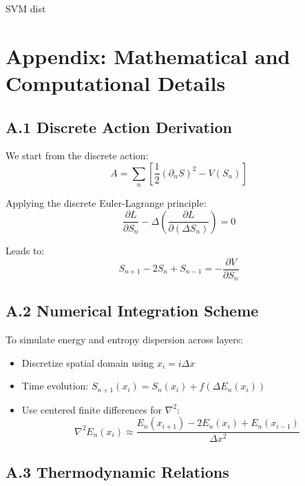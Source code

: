 \documentclass[11pt]{article}
\begin{document}
\medskip

SVM dist

\appendix
\section{Appendix: Mathematical and Computational Details}

\subsection*{A.1 Discrete Action Derivation}

We start from the discrete action:
\begin{equation*}
A = \sum_n \left[ \frac{1}{2} (\partial_n S)^2 - V(S_n) \right]
\end{equation*}

Applying the discrete Euler-Lagrange principle:
\begin{equation*}
\frac{\partial L}{\partial S_n} - \Delta \left( \frac{\partial L}{\partial (\Delta S_n)} \right) = 0
\end{equation*}

Leads to:
\begin{equation*}
S_{n+1} - 2S_n + S_{n-1} = - \frac{\partial V}{\partial S_n}
\end{equation*}

\subsection*{A.2 Numerical Integration Scheme}

To simulate energy and entropy dispersion across layers:
\begin{itemize}
  \item Discretize spatial domain using $x_i = i \Delta x$
  \item Time evolution: $S_{n+1}(x_i) = S_n(x_i) + f(\Delta E_n(x_i))$
  \item Use centered finite differences for $\nabla^2$:
\begin{equation*}
\nabla^2 E_n(x_i) \approx \frac{E_n(x_{i+1}) - 2E_n(x_i) + E_n(x_{i-1})}{\Delta x^2}
\end{equation*}
\end{itemize}

\subsection*{A.3 Thermodynamic Relations}
\end{document}
